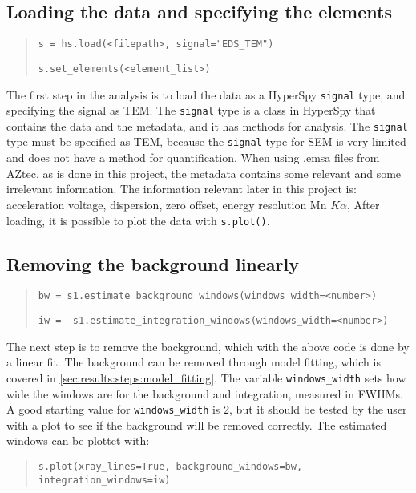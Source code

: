 \subsection{Loading the data and specifying the elements}
\label{sec:results:steps:load}
\begin{quote}
    \verb|s = hs.load(<filepath>, signal="EDS_TEM")|

    \verb|s.set_elements(<element_list>)|
\end{quote}

The first step in the analysis is to load the data as a HyperSpy \verb|signal| type, and specifying the signal as TEM.
The \verb|signal| type is a class in HyperSpy that contains the data and the metadata, and it has methods for analysis.
The \verb|signal| type must be specified as TEM, because the \verb|signal| type for SEM is very limited and does not have a method for quantification.
When using .emsa files from AZtec, as is done in this project, the metadata contains some relevant and some irrelevant information.
The information relevant later in this project is:
acceleration voltage, dispersion, zero offset, energy resolution Mn $K\alpha$,
After loading, it is possible to plot the data with \verb|s.plot()|.

\subsection{Removing the background linearly}
\label{sec:results:steps:background}
\begin{quote}
    \verb|bw = s1.estimate_background_windows(windows_width=<number>)|

    \verb|iw =  s1.estimate_integration_windows(windows_width=<number>)|
\end{quote}

The next step is to remove the background, which with the above code is done by a linear fit.
The background can be removed through model fitting, which is covered in \cref{sec:results:steps:model_fitting}.
The variable \verb|windows_width| sets how wide the windows are for the background and integration, measured in FWHMs.
A good starting value for \verb|windows_width| is 2, but it should be tested by the user with a plot to see if the background will be removed correctly.
The estimated windows can be plottet with:

\begin{quote}
    \verb|s.plot(xray_lines=True, background_windows=bw, integration_windows=iw)|
\end{quote}



